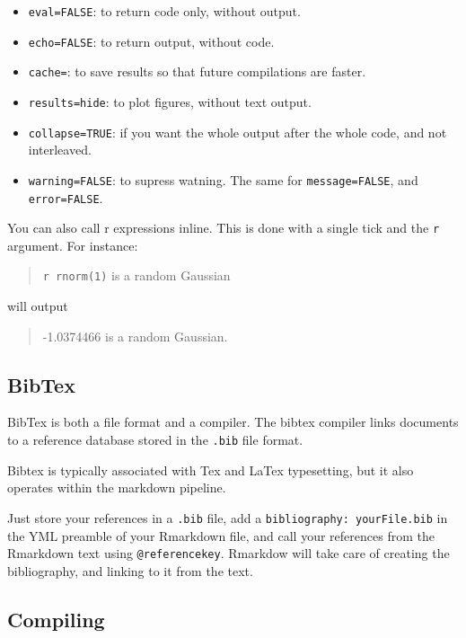 \documentclass[]{book}
\providecommand{\tightlist}{%
  \setlength{\itemsep}{0pt}\setlength{\parskip}{0pt}}
\theoremstyle{definition}
\theoremstyle{definition}
\theoremstyle{definition}
\theoremstyle{remark}
\begin{document}
\begin{itemize}
\tightlist
\item
  \texttt{eval=FALSE}: to return code only, without output.
\item
  \texttt{echo=FALSE}: to return output, without code.
\item
  \texttt{cache=}: to save results so that future compilations are
  faster.
\item
  \texttt{results=\textquotesingle{}hide\textquotesingle{}}: to plot
  figures, without text output.
\item
  \texttt{collapse=TRUE}: if you want the whole output after the whole
  code, and not interleaved.
\item
  \texttt{warning=FALSE}: to supress watning. The same for
  \texttt{message=FALSE}, and \texttt{error=FALSE}.
\end{itemize}

You can also call r expressions inline. This is done with a single tick
and the \texttt{r} argument. For instance:

\begin{quote}
\texttt{\textasciigrave{}r\ rnorm(1)\textasciigrave{}} is a random
Gaussian
\end{quote}

will output

\begin{quote}
-1.0374466 is a random Gaussian.
\end{quote}

\subsection{BibTex}\label{bibtex}

BibTex is both a file format and a compiler. The bibtex compiler links
documents to a reference database stored in the \texttt{.bib} file
format.

Bibtex is typically associated with Tex and LaTex typesetting, but it
also operates within the markdown pipeline.

Just store your references in a \texttt{.bib} file, add a
\texttt{bibliography:\ yourFile.bib} in the YML preamble of your
Rmarkdown file, and call your references from the Rmarkdown text using
\texttt{@referencekey}. Rmarkdow will take care of creating the
bibliography, and linking to it from the text.

\subsection{Compiling}\label{compiling}
\end{document}
